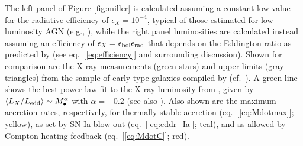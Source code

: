 \documentclass[usenatbib,fleqn]{mn2e}
\newcommand{\Mbh}[1][]{M_{\bullet#1}}
\begin{document}
The left panel of Figure \ref{fig:miller} is calculated assuming a
constant low value for the radiative efficiency of $\epsilon_X =
10^{-4}$, typical of those estimated for low luminosity AGN (e.g.,
\citealt{Ho:2009a}), while the right panel luminosities are calculated
instead assuming an efficiency of $\epsilon_X= \epsilon_{\rm
  bol}\epsilon_{\rm rad}$ that depends on the Eddington ratio
as predicted by \citet{Sharma+2007} (see eq.~[\ref{eq:efficiency}] and surrounding discussion).  Shown for comparison are the X-ray measurements (green stars) and upper limits
(gray triangles) from the sample of early-type galaxies compiled by
\citet{Miller+15} (cf.~\citealt{Gallo+10}).  A green line shows the
best power-law fit to the X-ray luminosity from \citet{Miller+15},
given by $\langle L_X/L_{\rm edd}\rangle \sim \Mbh^\alpha$ with
$\alpha = -0.2$ (see also \citealt{Zhang+09, Pellegrini10, Gallo+10}).
Also shown are the maximum accretion rates, respectively, for
thermally stable accretion (eq.~[\ref{eq:Mdotmax}]; yellow), as set by
SN Ia blow-out (eq.~[\ref{eq:eddr_Ia}]; teal), and as allowed by
Compton heating feedback (eq.~[\ref{eq:MdotC}]; red).
\end{document}
